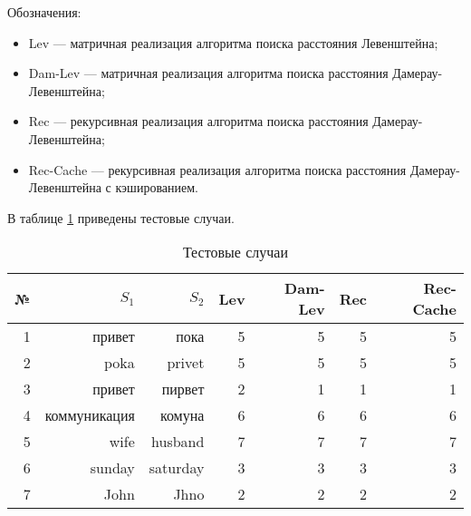 Обозначения:
\begin{itemize}
	\item Lev --- матричная реализация алгоритма поиска расстояния Левенштейна;
	\item Dam-Lev --- матричная реализация алгоритма поиска расстояния Дамерау-Левенштейна;
	\item Rec --- рекурсивная реализация алгоритма поиска расстояния Дамерау-Левенштейна;
	\item Rec-Cache --- рекурсивная реализация алгоритма поиска расстояния Дамерау-Левенштейна с кэшированием.
\end{itemize}

В таблице \ref{table:tests} приведены тестовые случаи.

\begin{table}[H]
	\centering
	\caption{\label{table:tests} Тестовые случаи}
	\begin{center}
		\begin{tabular}{|r|r|r|r|r|r|r|}
			\hline № & $S_1$ & $S_2$ & Lev & Dam-Lev & Rec & Rec-Cache \\ \hline
			1 & привет & пока & 5 & 5 & 5 & 5 \\ \hline
			2 & poka & privet & 5 & 5 & 5 & 5 \\ \hline
			3 & привет & пирвет & 2 & 1 & 1 & 1 \\ \hline
			4 & коммуникация & комуна & 6 & 6 & 6 & 6 \\ \hline
			5 & wife & husband & 7 & 7 & 7 & 7 \\ \hline
			6 & sunday & saturday & 3 & 3 & 3 & 3 \\ \hline
			7 & John & Jhno & 2 & 2 & 2 & 2 \\ \hline
		\end{tabular}
	\end{center}
\end{table}